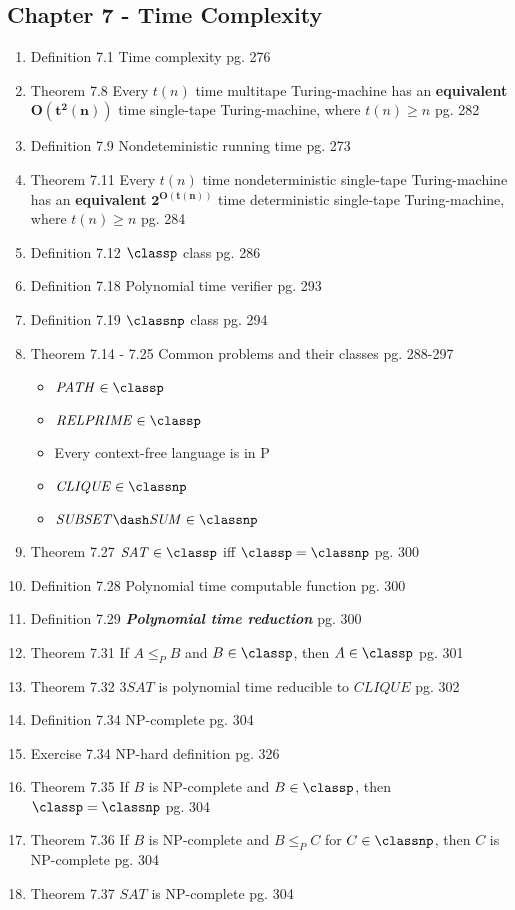 \documentclass[12pt]{article} %
\newcommand{\theoremitem}[3]{\item #1 \quad #2 \dotfill #3}
\newenvironment{theoremlist} {
    \begin{enumerate}[nosep,leftmargin=*,label={}]
} {
    \end{enumerate}
}
\begin{document}
\subsection{Chapter 7 - Time Complexity}
\begin{theoremlist}
    \theoremitem{Definition 7.1}
    {Time complexity}
    {pg. 276}
    \theoremitem{Theorem 7.8}
    {Every $t(n)$ time multitape Turing-machine has an \textbf{equivalent} $\mathbf{O(t^2 (n))}$ time single-tape Turing-machine, where $t(n)\geq n$}
    {pg. 282}
    \theoremitem{Definition 7.9}
    {Nondeteministic running time}
    {pg. 273}
    \theoremitem{Theorem 7.11}
    {Every $t(n)$ time nondeterministic single-tape Turing-machine has an \textbf{equivalent} $\mathbf{2^{O(t(n))}}$ time deterministic single-tape Turing-machine, where $t(n)\geq n$}
    {pg. 284}
    \theoremitem{Definition 7.12}
    {$\classp$ class}
    {pg. 286}
    \theoremitem{Definition 7.18}
    {Polynomial time verifier}
    {pg. 293}
    \theoremitem{Definition 7.19}
    {$\classnp$ class}
    {pg. 294}

    \theoremitem{Theorem 7.14 - 7.25}
    {Common problems and their classes}
    {pg. 288-297}
    \begin{multicols}{2}
    \begin{itemize}[nosep]
        \item $\mathit{PATH}\in\classp$
        \item $\mathit{RELPRIME}\in\classp$
        \item Every context-free language is in P
        \item $\mathit{CLIQUE}\in\classnp$
        \item $\mathit{SUBSET\dash SUM}\in\classnp$
    \end{itemize}
    \end{multicols}
    
    \theoremitem{Theorem 7.27}
    {$\mathit{SAT}\in\classp$ iff $\classp=\classnp$}
    {pg. 300}
    \theoremitem{Definition 7.28}
    {Polynomial time computable function}
    {pg. 300}
    \theoremitem{Definition 7.29}
    {\textbf{\textit{Polynomial time reduction}}}
    {pg. 300}
    \theoremitem{Theorem 7.31}
    {If $A\leq_P B$ and $B\in\classp$, then $A\in\classp$}
    {pg. 301}
    \theoremitem{Theorem 7.32}
    {$3\mathit{SAT}$ is polynomial time reducible to $\mathit{CLIQUE}$}
    {pg. 302}
    \theoremitem{Definition 7.34}
    {NP-complete}
    {pg. 304}
    \theoremitem{Exercise 7.34}
    {NP-hard definition}
    {pg. 326}
    \theoremitem{Theorem 7.35}
    {If $B$ is NP-complete and $B\in\classp$, then $\classp=\classnp$}
    {pg. 304}
    \theoremitem{Theorem 7.36}
    {If $B$ is NP-complete and $B\leq_P C$ for $C\in\classnp$, then $C$ is NP-complete}
    {pg. 304}
    \theoremitem{Theorem 7.37}
    {$\mathit{SAT}$ is NP-complete}
    {pg. 304}


\end{theoremlist}
\end{document}
